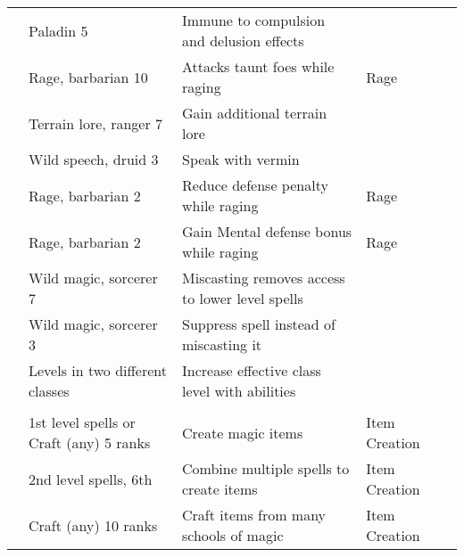 \begin{longtabuwrapper}
\begin{longtabu}{>{\lcol}p{10em} >{\lcol}p{15em} >{\lcol}X >{\lcol}p{8em} >{\lcol}p{3em}}
             & Paladin 5                         & Immune to compulsion and delusion effects & \x &  \\
                 & Rage, barbarian 10                & Attacks taunt foes while raging & Rage &  \\
         & Terrain lore, ranger 7 & Gain additional terrain lore & \x &  \\
                 & Wild speech, druid 3              & Speak with vermin & \x &  \\
                     & Rage, barbarian 2                 & Reduce defense penalty while raging & Rage &  \\
                  & Rage, barbarian 2                 & Gain Mental defense bonus while raging & Rage &  \\
             & Wild magic, sorcerer 7            & Miscasting removes access to lower level spells & \x &  \\
             & Wild magic, sorcerer 3            & Suppress spell instead of miscasting it & \x &  \\
                   & Levels in two different classes   & Increase effective class level with abilities & \x &  \\

        \midrule
         &  &  &  &  \\
         & 1st level spells or Craft (any) 5 ranks & Create magic items & Item Creation &  \\
         & 2nd level spells, 6th & Combine multiple spells to create items & Item Creation &  \\
         & Craft (any) 10 ranks & Craft items from many schools of magic & Item Creation &  \\


\end{longtabu}
\end{longtabuwrapper}
